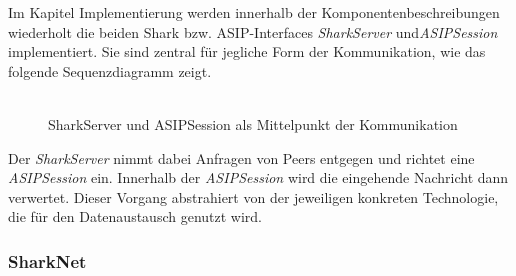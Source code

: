 Im Kapitel Implementierung werden innerhalb der Komponentenbeschreibungen wiederholt die beiden Shark bzw. ASIP-Interfaces \textit{SharkServer} und\textit{ASIPSession} implementiert. Sie sind zentral für jegliche Form der Kommunikation, wie das folgende Sequenzdiagramm zeigt.\\\\
\begin{figure}[H]
	\centering
	\caption{SharkServer und ASIPSession als Mittelpunkt der Kommunikation}
	\label{fig:sharkCommunication}
\end{figure}
Der \textit{SharkServer} nimmt dabei Anfragen von Peers entgegen und richtet eine \textit{ASIPSession} ein. Innerhalb der \textit{ASIPSession} wird die eingehende Nachricht dann verwertet. Dieser Vorgang abstrahiert von der jeweiligen konkreten Technologie, die für den Datenaustausch genutzt wird. 
\newpage

\subsubsection{SharkNet}

